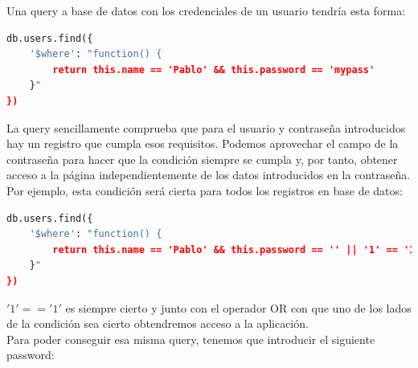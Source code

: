 \documentclass[a4paper,oneside]{article}
\begin{document}
\begin{enumerate}[label=\textbf{\alph*)}]
Una query a base de datos con los credenciales de un usuario tendría esta forma:
\begin{lstlisting}[caption={Query de login}, language=Python]
db.users.find({
	'$where': "function() { 
		return this.name == 'Pablo' && this.password == 'mypass'
	}"
})
\end{lstlisting}

La query sencillamente comprueba que para el usuario y contraseña introducidos hay un registro que cumpla esos requisitos. Podemos aprovechar el campo de la contraseña para hacer que la condición siempre se cumpla y, por tanto, obtener acceso a la página independientemente de los datos introducidos en la contraseña. Por ejemplo, esta condición será cierta para todos los registros en base de datos:
\begin{lstlisting}[caption={Query vulnerable}, label={lst:inyeccion}, language=Python]
db.users.find({
	'$where': "function() { 
		return this.name == 'Pablo' && this.password == '' || '1' == '1' 
	}"
})
\end{lstlisting}

$'1' == '1'$ es siempre cierto y junto con el operador OR con que uno de los lados de la condición sea cierto obtendremos acceso a la aplicación.\\

Para poder conseguir esa misma query, tenemos que introducir el siguiente password:


\end{enumerate}
\end{document}
